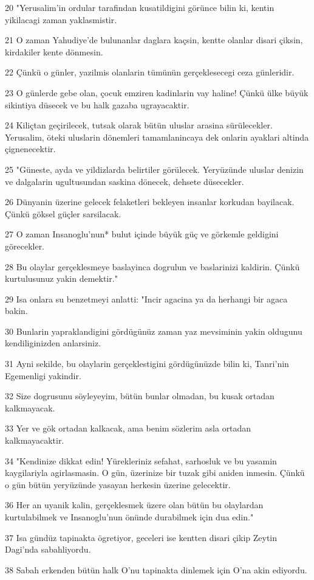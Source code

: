 \par 20 "Yerusalim'in ordular tarafindan kusatildigini görünce bilin ki, kentin yikilacagi zaman yaklasmistir.
\par 21 O zaman Yahudiye'de bulunanlar daglara kaçsin, kentte olanlar disari çiksin, kirdakiler kente dönmesin.
\par 22 Çünkü o günler, yazilmis olanlarin tümünün gerçeklesecegi ceza günleridir.
\par 23 O günlerde gebe olan, çocuk emziren kadinlarin vay haline! Çünkü ülke büyük sikintiya düsecek ve bu halk gazaba ugrayacaktir.
\par 24 Kiliçtan geçirilecek, tutsak olarak bütün uluslar arasina sürülecekler. Yerusalim, öteki uluslarin dönemleri tamamlanincaya dek onlarin ayaklari altinda çignenecektir.
\par 25 "Güneste, ayda ve yildizlarda belirtiler görülecek. Yeryüzünde uluslar denizin ve dalgalarin ugultusundan saskina dönecek, dehsete düsecekler.
\par 26 Dünyanin üzerine gelecek felaketleri bekleyen insanlar korkudan bayilacak. Çünkü göksel güçler sarsilacak.
\par 27 O zaman Insanoglu'nun* bulut içinde büyük güç ve görkemle geldigini görecekler.
\par 28 Bu olaylar gerçeklesmeye baslayinca dogrulun ve baslarinizi kaldirin. Çünkü kurtulusunuz yakin demektir."
\par 29 Isa onlara su benzetmeyi anlatti: "Incir agacina ya da herhangi bir agaca bakin.
\par 30 Bunlarin yapraklandigini gördügünüz zaman yaz mevsiminin yakin oldugunu kendiliginizden anlarsiniz.
\par 31 Ayni sekilde, bu olaylarin gerçeklestigini gördügünüzde bilin ki, Tanri'nin Egemenligi yakindir.
\par 32 Size dogrusunu söyleyeyim, bütün bunlar olmadan, bu kusak ortadan kalkmayacak.
\par 33 Yer ve gök ortadan kalkacak, ama benim sözlerim asla ortadan kalkmayacaktir.
\par 34 "Kendinize dikkat edin! Yürekleriniz sefahat, sarhosluk ve bu yasamin kaygilariyla agirlasmasin. O gün, üzerinize bir tuzak gibi aniden inmesin. Çünkü o gün bütün yeryüzünde yasayan herkesin üzerine gelecektir.
\par 36 Her an uyanik kalin, gerçeklesmek üzere olan bütün bu olaylardan kurtulabilmek ve Insanoglu'nun önünde durabilmek için dua edin."
\par 37 Isa gündüz tapinakta ögretiyor, geceleri ise kentten disari çikip Zeytin Dagi'nda sabahliyordu.
\par 38 Sabah erkenden bütün halk O'nu tapinakta dinlemek için O'na akin ediyordu.

